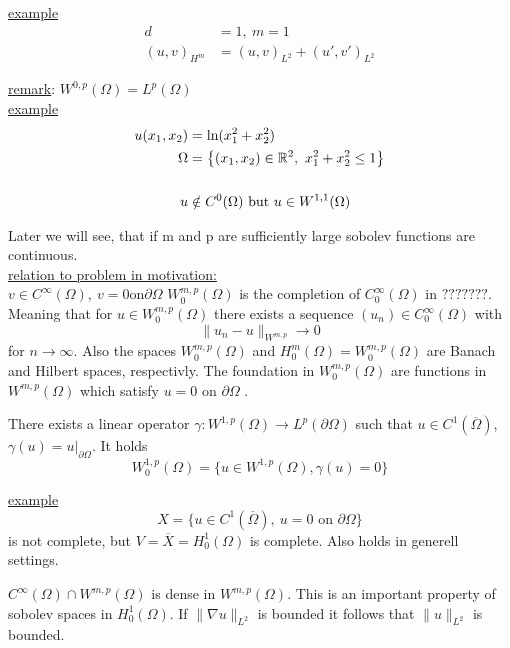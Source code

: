 \underline{example}
\begin{align*}
 	d&=1,\ m=1\\
 	(u,v)_{H^m} &= (u,v)_{L^2} + (u',v')_{L^2}
\end{align*} 
 
\underline{remark}: $W^{0,p}(\Omega) = L^p(\Omega)$\\
  
\underline{example}
\begin{align*}
 	u(x_1,x_2) &= \text{ln}(x^2_1 + x^2_2)\\
 	\Omega &= \big \{  (x_1,x_2)\in\mathbb{R}^2,\ x^2_1 + x^2_2 \leq 1    \big \} \\
 	& \\
 	u &\notin C^0(\Omega) \text{ but } u \in W^{1,1}(\Omega)
\end{align*}
 
Later we will see, that if m and p are sufficiently large sobolev functions are continuous.\\
 
\underline{relation to problem in motivation:}\\
\glqq $v \in C^\infty(\Omega),\ v=0 \text{on} \partial\Omega$ \grqq \enter
$W^{m,p}_0(\Omega)$ is the completion of $C^\infty_0(\Omega)$ in $ ??????? $. Meaning that for $u \in W^{m,p}_0(\Omega)$ there exists a sequence $(u_n) \in C^\infty_0(\Omega)$ with 
\begin{equation*}
	\|u_n - u\|_{W^{m,p}} \to 0
\end{equation*}
for $n \to \infty$.\enter
Also the spaces $W^{m,p}_0(\Omega)$ and $H^m_0(\Omega) = W^{m,p}_0(\Omega)$ are Banach and Hilbert spaces, respectivly. The foundation in $W^{m,p}_0(\Omega)$ are functions in $W^{m,p}(\Omega)$ which satisfy \glqq $u =0$ on $\partial \Omega$ \grqq. \enter 
\par

There exists a linear operator $\gamma: W^{1,p}(\Omega) \to L^p(\partial\Omega)$ such that $u \in C^1(\overline{\Omega})$, $\gamma(u) = u|_{\partial \Omega}$. It holds 
\begin{equation*}
	W^{1,p}_0(\Omega) = \big \{ u \in W^{1,p}(\Omega), \gamma(u) = 0 \big \}
\end{equation*}

\underline{example}
\begin{equation*}
	X= \big \{ u \in C^1(\overline{\Omega}), \ u=0 \text{ on } \partial\Omega  \big \}
\end{equation*}
is not complete, but $V = \overline{X} = H^1_0(\Omega)$ is complete. Also holds in  generell settings.\\
\par
 $C^\infty(\Omega)\cap W^{m,p}(\Omega)$ is dense in $ W^{m,p}(\Omega)$.
This is an important property of sobolev spaces in $H^1_0(\Omega)$. \enter
If $\|\nabla u \|_{L^2}$ is bounded it follows that $\|u \|_{L^2}$ is bounded.

